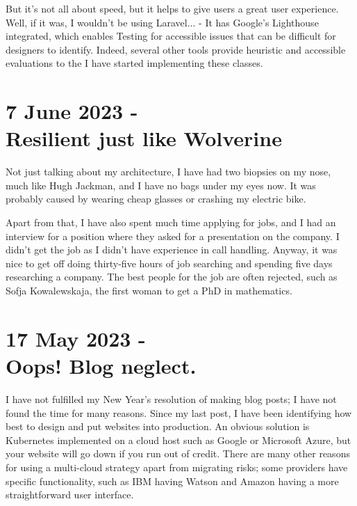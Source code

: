 \documentclass{article}
\begin{document}
But it's not all about speed, but it helps to give users a great user experience. Well, if it was, I wouldn't be using Laravel... - It has Google's Lighthouse integrated, which enables Testing for accessible issues that can be difficult for designers to identify. Indeed, several other tools provide heuristic and accessible evaluations to the I have started implementing these classes.



\section*{7 June 2023 - \\ Resilient just like Wolverine}

Not just talking about my architecture, I have had two biopsies on my nose, much like Hugh Jackman, and I have no bags under my eyes now. It was probably caused by wearing cheap glasses or crashing my electric bike. 

Apart from that, I have also spent much time applying for jobs, and I had an interview for a position where they asked for a presentation on the company. I didn't get the job as I didn't have experience in call handling. Anyway, it was nice to get off doing thirty-five hours of job searching and spending five days researching a company. The best people for the job are often rejected, such as Sofja Kowalewskaja, the first woman to get a PhD in mathematics.

\section*{17 May 2023 - \\ Oops! Blog neglect.}

I have not fulfilled my New Year's resolution of making blog posts; I have not found the time for many reasons. Since my last post, I have been identifying how best to design and put websites into production. An obvious solution is Kubernetes implemented on a cloud host such as Google or Microsoft Azure, but your website will go down if you run out of credit. There are many other reasons for using a multi-cloud strategy apart from migrating risks; some providers have specific functionality, such as IBM having Watson and Amazon having a more straightforward user interface. 
\end{document}
